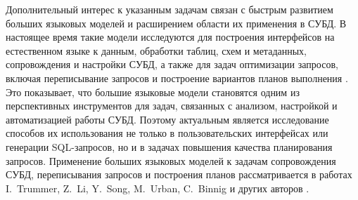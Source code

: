 

Дополнительный интерес к указанным задачам связан с быстрым развитием больших языковых моделей и расширением области их применения в СУБД. В настоящее время такие модели исследуются для построения интерфейсов на естественном языке к данным, обработки таблиц, схем и метаданных, сопровождения и настройки СУБД, а также для задач оптимизации запросов, включая переписывание запросов и построение вариантов планов выполнения \cite{Zhou2024DBGPTLL,10.1007/s11704-025-50592-w,10.1007/s11704-024-40763-6,parciak2024schemamatchinglargelanguage,10.1007/s00778-023-00831-y,li2024llmr2,song2026quitequeryrewriterules,10.1145/3626246.3654732}. Это показывает, что большие языковые модели становятся одним из перспективных инструментов для задач, связанных с анализом, настройкой и автоматизацией работы СУБД. Поэтому актуальным является исследование способов их использования не только в пользовательских интерфейсах или генерации SQL-запросов, но и в задачах повышения качества планирования запросов. Применение больших языковых моделей к задачам сопровождения СУБД, переписывания запросов и построения планов рассматривается в работах I.~Trummer, Z.~Li, Y.~Song, M.~Urban, C.~Binnig и других авторов \cite{10.1007/s00778-023-00831-y,li2024llmr2,song2026quitequeryrewriterules,10.1145/3626246.3654732}.

